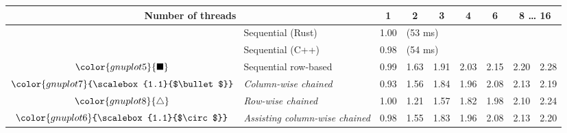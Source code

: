 \begin{tabular}{clrrrrrrr}
\toprule
\multicolumn{2}{c}{\textbf{Number of threads}} & \multicolumn{1}{c}{\textbf{ 1 }} & \multicolumn{1}{c}{\textbf{ 2 }} & \multicolumn{1}{c}{\textbf{ 3 }} & \multicolumn{1}{c}{\textbf{ 4 }} & \multicolumn{1}{c}{\textbf{ 6 }} & \multicolumn{2}{c}{\textbf{ 8 } \dots \textbf{ 16 }} \\
\midrule
& Sequential (Rust) & \multicolumn{1}{r}{ 1.00 } & \multicolumn{ 6 }{l}{(53 ms)} \\
& Sequential (C++) & \multicolumn{1}{r}{ 0.98 } & \multicolumn{ 6 }{l}{(54 ms)} \\
\rowcolor{gnuplot5!10}$\color{gnuplot5}{\blacksquare}$ & Sequential row-based & \cellcolor{gnuplot5!10} 0.99 & \cellcolor{gnuplot5!10} 1.63 & \cellcolor{gnuplot5!10} 1.91 & \cellcolor{gnuplot5!10} 2.03 & \cellcolor{gnuplot5!10} 2.15 & \cellcolor{gnuplot5!10} 2.20 & \cellcolor{gnuplot5!10} 2.28 \\
\rowcolor{gnuplot7!30}$\color{gnuplot7}{\scalebox{1.1}{$\bullet$}}$ & \textit{Column-wise chained} & \cellcolor{gnuplot7!30} 0.93 & \cellcolor{gnuplot7!30} 1.56 & \cellcolor{gnuplot7!30} 1.84 & \cellcolor{gnuplot7!30} 1.96 & \cellcolor{gnuplot7!30} 2.08 & \cellcolor{gnuplot7!30} 2.13 & \cellcolor{gnuplot7!30} 2.19 \\
\rowcolor{gnuplot8!30}$\color{gnuplot8}{\triangle}$ & \textit{Row-wise chained} & \cellcolor{gnuplot8!30} 1.00 & \cellcolor{gnuplot8!30} 1.21 & \cellcolor{gnuplot8!30} 1.57 & \cellcolor{gnuplot8!30} 1.82 & \cellcolor{gnuplot8!30} 1.98 & \cellcolor{gnuplot8!30} 2.10 & \cellcolor{gnuplot8!30} 2.24 \\
\rowcolor{gnuplot6!30}$\color{gnuplot6}{\scalebox{1.1}{$\circ$}}$ & \textit{Assisting column-wise chained} & \cellcolor{gnuplot6!30} 0.98 & \cellcolor{gnuplot6!30} 1.55 & \cellcolor{gnuplot6!30} 1.83 & \cellcolor{gnuplot6!30} 1.96 & \cellcolor{gnuplot6!30} 2.08 & \cellcolor{gnuplot6!30} 2.13 & \cellcolor{gnuplot6!30} 2.20 \\
\bottomrule
\end{tabular}
